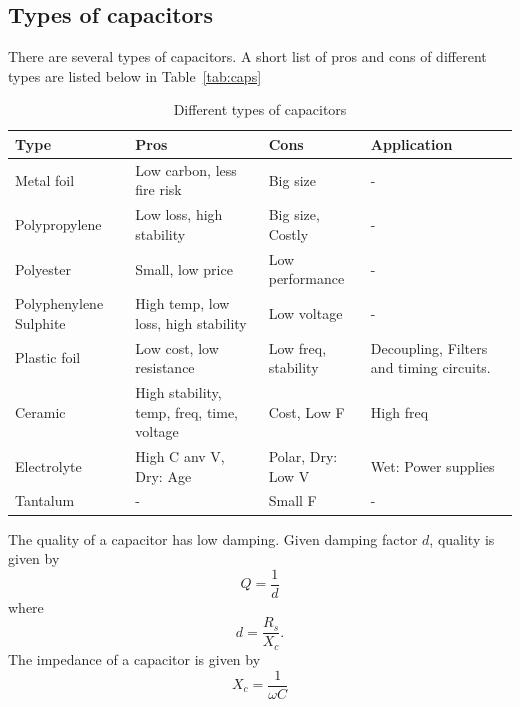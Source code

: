 \subsection*{Types of capacitors}
There are several types of capacitors. A short list of pros and cons of
different types are listed below in Table~\ref{tab:caps}
\begin{table}[H]
    \centering
    \begin{tabular}{| p{2cm} | p{2cm} | p{2cm} | p{4cm} |}
    \hline
    Type & Pros & Cons & Application \\
    \hline
    Metal foil & Low carbon, less fire risk & Big size & - \\
    \hline
    Polypropylene & Low loss, high stability & Big size, Costly & - \\
    \hline
    Polyester & Small, low price & Low performance & - \\
    \hline
    Polyphenylene Sulphite & High temp, low loss, high stability & Low voltage &
    - \\
    \hline
    Plastic foil & Low cost, low resistance & Low freq, stability & Decoupling,
    Filters and timing circuits. \\
    \hline
    Ceramic & High stability, temp, freq, time, voltage & Cost, Low F & High
    freq \\
    \hline
    Electrolyte & High C anv V, Dry: Age & Polar, Dry: Low V & Wet: Power
    supplies \\
    \hline
    Tantalum & - & Small F & - \\
    \hline
\end{tabular}
\caption{Different types of capacitors}
\label{tab:cap}
\end{table}
The quality of a capacitor has low damping. Given damping factor $d$, quality is
given by
\begin{equation}
    Q = \frac {1} {d}
\end{equation}
where 
\begin{equation}
    d = \frac {R_s} {X_c}.
\end{equation}
The impedance of a capacitor is given by
\begin{equation}
    X_c = \frac {1} {\omega C}
\end{equation}
